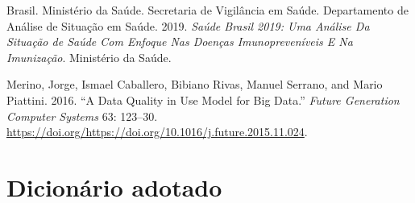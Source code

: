 \documentclass[
  12,
  table]{proadi}
\begin{document}
\hypertarget{refs}{}
\leavevmode\hypertarget{ref-brasil2019}{}%
Brasil. Ministério da Saúde. Secretaria de Vigilância em Saúde.
Departamento de Análise de Situação em Saúde. 2019. \emph{Saúde Brasil
2019: Uma Análise Da Situação de Saúde Com Enfoque Nas Doenças
Imunopreveníveis E Na Imunização}. Ministério da Saúde.

\leavevmode\hypertarget{ref-merino}{}%
Merino, Jorge, Ismael Caballero, Bibiano Rivas, Manuel Serrano, and
Mario Piattini. 2016. ``A Data Quality in Use Model for Big Data.''
\emph{Future Generation Computer Systems} 63: 123--30.
\url{https://doi.org/https://doi.org/10.1016/j.future.2015.11.024}.

\captionsetup[table]{labelformat=empty}

\newpage

\hypertarget{dicionuxe1rio-adotado}{%
\section*{Dicionário adotado}\label{dicionuxe1rio-adotado}}

\begingroup\fontsize{10}{12}\selectfont
\end{document}
